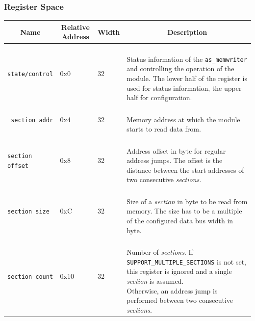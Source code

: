 \subsubsection{Register Space}

\begin{longtable}[ht]{|l|l|l|l|}
    \hline
    \multicolumn{1}{|c|}{\textbf{Name}} & \multicolumn{1}{c|}{\textbf{Relative Address}} & \multicolumn{1}{c|}{\textbf{Width}} & \multicolumn{1}{c|}{\textbf{Description}}\\
    \hline
    
    \texttt{state/control} & 0x0 & 32 & \parbox{7cm}{\ \\
        Status information of the \texttt{as\_memwriter} and controlling the operation of the module. The lower half of the register is used for status information, the upper half for configuration.\\
    }\\
    \hline
    
    \texttt{ section addr} & 0x4 & 32 & \parbox{7cm}{\ \\
        Memory address at which the module starts to read data from.\\
    }\\
    \hline
    
    \texttt{section offset} & 0x8 & 32 & \parbox{7cm}{\ \\
        Address offset in byte for regular address jumps. The offset is the distance between the start addresses of two consecutive \textit{sections}.\\
    }\\
    \hline
    
    \texttt{section size} & 0xC & 32 & \parbox{7cm}{\ \\
        Size of a \textit{section} in byte to be read from memory. The size has to be a multiple of the configured data bus width in byte.\\
    }\\
    \hline
    
    \texttt{section count} & 0x10 & 32 & \parbox{7cm}{\ \\
        Number of \textit{sections}. If \texttt{SUPPORT\_MULTIPLE\_SECTIONS} is not set, this register is ignored and a single \textit{section} is assumed.\\
        Otherwise, an address jump is performed between two consecutive \textit{sections}.\\
    }\\
    \hline
    

\end{longtable}
